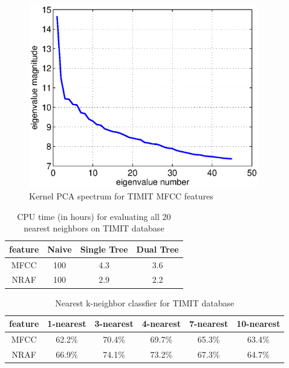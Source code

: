 \documentclass[12pt,letterpaper,doublespaced,ETD,dvips,proposal]{gtthesis}
\begin{document}
\begin{Body}

\begin{figure}[!htb]
\label{kernel_pca}
\centerline{\includegraphics[height=8cm]{kernel_pca.eps}}
\caption{Kernel PCA spectrum for TIMIT MFCC features}
\end{figure}


\begin{table}[!htb]
\footnotesize{ \centering
\begin{tabular}{|c|c|c|c|}
  \hline
  feature & Naive & Single Tree & Dual Tree \\
  \hline
  MFCC & 100 & 4.3 & 3.6 \\
  NRAF & 100 & 2.9 & 2.2 \\
  \hline
\end{tabular}
 \caption {CPU time (in hours) for evaluating all 20 nearest neighbors on
  TIMIT database}
  }
  \label{timing}
\end{table}

\begin{table}[!htb]
\footnotesize{ \centering
\begin{tabular}{|c|c|c|c|c|c|}
  \hline
  feature & 1-nearest & 3-nearest & 4-nearest & 7-nearest & 10-nearest \\
  \hline
  MFCC & 62.2\% & 70.4\% & 69.7\% & 65.3\% & 63.4\% \\
  NRAF & 66.9\% & 74.1\% & 73.2\% & 67.3\% & 64.7\% \\
  \hline
\end{tabular}
\caption{Nearest k-neighbor classfier for TIMIT database} }
\label{kneighborTIMIT}
\end{table}


\end{Body}
\end{document}
